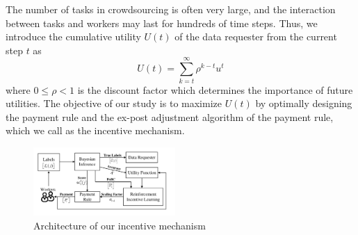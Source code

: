 \documentclass{article}
\begin{document}
The number of tasks in crowdsourcing is often very large, and the interaction between tasks and workers may last for hundreds of time steps.
Thus, we introduce the cumulative utility $U(t)$ of the data requester from the current step $t$ as
\begin{equation}
U(t)={\sum}_{k=t}^{\infty}\rho^{k-t}u^t
\end{equation}
where $0\leq \rho< 1$ is the discount factor which determines the importance of future utilities.
The objective of our study is to maximize $U(t)$ by optimally designing the payment rule and the ex-post adjustment algorithm of the payment rule, which we call as the incentive mechanism.







%


\begin{figure}[t]
 	\centering
	\includegraphics[width=0.48\textwidth]{image/Architecture}
	\vspace*{-8mm}
    \caption{\label{Archi} Architecture of our incentive mechanism}
\end{figure}
\end{document}
